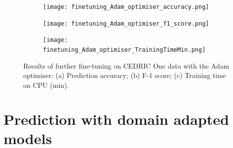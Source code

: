 \documentclass[a4paper,12pt]{article}
\newcommand{\figwidthhh}{0.45\textwidth}
\newcommand{\inghamOne}{CEDRIC One\xspace}   %
\begin{document}
	
\begin{figure}[h!]
	\begin{center}
		\begin{subfigure}[b]{\figwidthhh}
			\caption{} 
			\texttt{[image: finetuning\_Adam\_optimiser\_accuracy.png]}
		\end{subfigure}
        \hfill
		\begin{subfigure}[b]{\figwidthhh}
			\caption{}
			\texttt{[image: finetuning\_Adam\_optimiser\_f1\_score.png]}
		\end{subfigure}
        \hfill
		\begin{subfigure}[b]{\figwidthhh}
			\caption{}
			\texttt{[image: finetuning\_Adam\_optimiser\_TrainingTimeMin.png]}
		\end{subfigure}
	\end{center}                                                                
	\caption{Results of further fine-tuning on \inghamOne data with the Adam optimiser: (a) Prediction accuracy; (b) F-1 score; (c) Training time on CPU (min).
	} 
\end{figure}


\newpage


\section{Prediction with domain adapted models}
\end{document}

